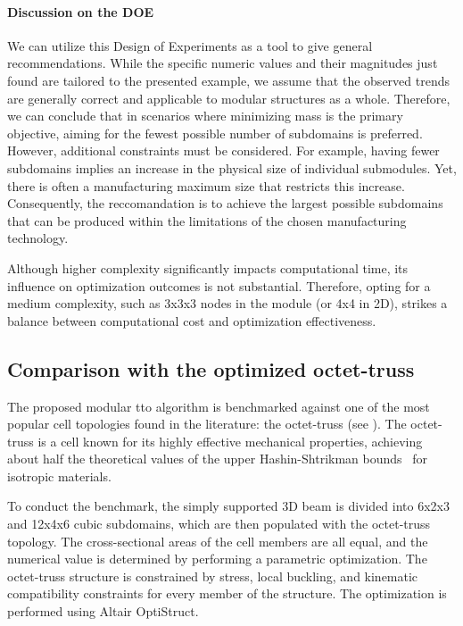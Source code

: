 \paragraph{Discussion on the DOE}
We can utilize this Design of Experiments as a tool to give general recommendations. While the specific numeric values and their magnitudes just found are tailored to the presented example, we assume that the observed trends are generally correct and applicable to modular structures as a whole. Therefore, we can conclude that in scenarios where minimizing mass is the primary objective, aiming for the fewest possible number of subdomains is preferred. However, additional constraints must be considered. For example, having fewer subdomains implies an increase in the physical size of individual submodules. Yet, there is often a manufacturing maximum size that restricts this increase. Consequently, the reccomandation is to achieve the largest possible subdomains that can be produced within the limitations of the chosen manufacturing technology.

Although higher complexity significantly impacts computational time, its influence on optimization outcomes is not substantial. Therefore, opting for a medium complexity, such as 3x3x3 nodes in the module (or 4x4 in 2D), strikes a balance between computational cost and optimization effectiveness.

\subsection{Comparison with the optimized octet-truss}
The proposed modular \gls{tto} algorithm is benchmarked against one of the most popular cell topologies found in the literature: the octet-truss (see ). The octet-truss is a cell known for its highly effective mechanical properties, achieving about half the theoretical values of the upper Hashin-Shtrikman bounds~ for isotropic materials.

To conduct the benchmark, the simply supported 3D beam is divided into 6x2x3 and 12x4x6 cubic subdomains, which are then populated with the octet-truss topology. The cross-sectional areas of the cell members are all equal, and the numerical value is determined by performing a parametric optimization. The octet-truss structure is constrained by stress, local buckling, and kinematic compatibility constraints for every member of the structure. The optimization is performed using Altair OptiStruct.


